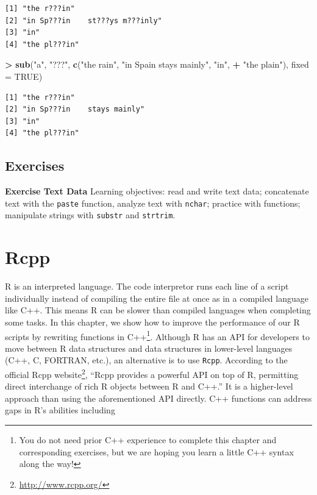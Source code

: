 \documentclass[
]{krantz}
\makeatletter
\newenvironment{Shaded}{\begin{snugshade}}{\end{snugshade}}
\newcommand{\DataTypeTok}[1]{\textcolor[rgb]{0.27,0.27,0.27}{#1}}
\newcommand{\KeywordTok}[1]{\textcolor[rgb]{0.27,0.27,0.27}{\textbf{#1}}}
\newcommand{\NormalTok}[1]{#1}
\newcommand{\OperatorTok}[1]{\textcolor[rgb]{0.43,0.43,0.43}{\textbf{#1}}}
\newcommand{\OtherTok}[1]{\textcolor[rgb]{0.37,0.37,0.37}{#1}}
\newcommand{\StringTok}[1]{\textcolor[rgb]{0.5,0.5,0.5}{#1}}
\renewcommand{\href}[2]{#2\footnote{\url{#1}}}
\newenvironment{kframe}{%
\medskip{}
\setlength{\fboxsep}{.8em}
 \def\at@end@of@kframe{}%
 \ifinner\ifhmode%
  \def\at@end@of@kframe{\end{minipage}}%
  \begin{minipage}{\columnwidth}%
 \fi\fi%
 \def\FrameCommand##1{\hskip\@totalleftmargin \hskip-\fboxsep
 \colorbox{shadecolor}{##1}\hskip-\fboxsep
     \hskip-\linewidth \hskip-\@totalleftmargin \hskip\columnwidth}%
 \MakeFramed {\advance\hsize-\width
   \@totalleftmargin\z@ \linewidth\hsize
   \@setminipage}}%
 {\par\unskip\endMakeFramed%
 \at@end@of@kframe}
\renewenvironment{Shaded}{\begin{kframe}}{\end{kframe}}
\makeatother
\begin{document}
\begin{verbatim}
[1] "the r???in"                    
[2] "in Sp???in    st???ys m???inly"
[3] "in"                            
[4] "the pl???in"                   
\end{verbatim}

\begin{Shaded}
\begin{Highlighting}[]
\OperatorTok{\textgreater{}}\StringTok{ }\KeywordTok{sub}\NormalTok{(}\StringTok{"a"}\NormalTok{, }\StringTok{"???"}\NormalTok{, }\KeywordTok{c}\NormalTok{(}\StringTok{"the rain"}\NormalTok{, }\StringTok{"in Spain    stays mainly"}\NormalTok{, }\StringTok{"in"}\NormalTok{, }
\OperatorTok{+}\StringTok{                   "the plain"}\NormalTok{), }\DataTypeTok{fixed =} \OtherTok{TRUE}\NormalTok{)}
\end{Highlighting}
\end{Shaded}

\begin{verbatim}
[1] "the r???in"                
[2] "in Sp???in    stays mainly"
[3] "in"                        
[4] "the pl???in"               
\end{verbatim}

\hypertarget{exercises-8}{%
\section{Exercises}\label{exercises-8}}

\textbf{Exercise Text Data} Learning objectives: read and write text data; concatenate text with the \texttt{paste} function, analyze text with \texttt{nchar}; practice with functions; manipulate strings with \texttt{substr} and \texttt{strtrim}.

\hypertarget{rcpp}{%
\chapter{Rcpp}\label{rcpp}}

R is an interpreted language. The code interpretor runs each line of a script individually instead of compiling the entire file at once as in a compiled language like C++. This means R can be slower than compiled languages when completing some tasks. In this chapter, we show how to improve the performance of our R scripts by rewriting functions in C++\footnote{You do not need prior C++ experience to complete this chapter and corresponding exercises, but we are hoping you learn a little C++ syntax along the way!}. Although R has an API for developers to move between R data structures and data structures in lower-level languages (C++, C, FORTRAN, etc.), an alternative is to use \texttt{Rcpp}. According to the \href{http://www.rcpp.org/}{official Rcpp website}, ``Rcpp provides a powerful API on top of R, permitting direct interchange of rich R objects between R and C++.'' It is a higher-level approach than using the aforementioned API directly. C++ functions can address gaps in R's abilities including
\end{document}

